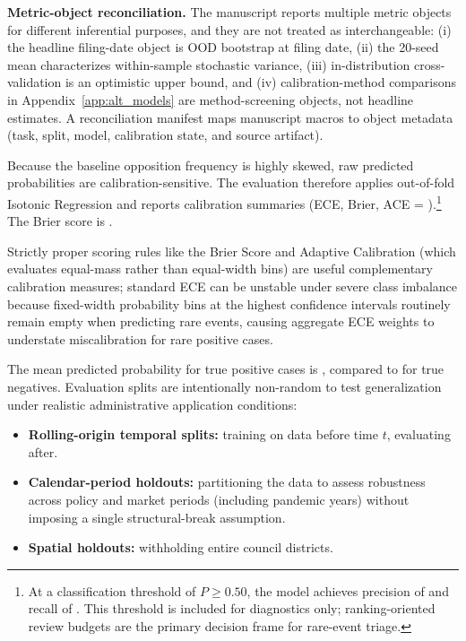 \documentclass[11pt, letterpaper]{article}
\begin{document}
\textbf{Metric-object reconciliation.} The manuscript reports multiple metric objects for different inferential purposes, and they are not treated as interchangeable: (i) the headline filing-date object is OOD bootstrap at filing date, (ii) the 20-seed mean characterizes within-sample stochastic variance, (iii) in-distribution cross-validation is an optimistic upper bound, and (iv) calibration-method comparisons in Appendix~\ref{app:alt_models} are method-screening objects, not headline estimates. A reconciliation manifest maps manuscript macros to object metadata (task, split, model, calibration state, and source artifact).

Because the baseline opposition frequency is highly skewed, raw predicted probabilities are calibration-sensitive. The evaluation therefore applies out-of-fold Isotonic Regression and reports calibration summaries (ECE, Brier, ACE = \metricACE{}).\footnote{At a classification threshold of $P \geq 0.50$, the model achieves precision of \metricPrecisionAtFifty{} and recall of \metricRecallAtFifty{}. This threshold is included for diagnostics only; ranking-oriented review budgets are the primary decision frame for rare-event triage.} The Brier score is \metricBrierScore{}.

Strictly proper scoring rules like the Brier Score \cite{brier1950verification} and Adaptive Calibration (which evaluates equal-mass rather than equal-width bins) are useful complementary calibration measures; standard ECE can be unstable under severe class imbalance because fixed-width probability bins at the highest confidence intervals routinely remain empty when predicting rare events, causing aggregate ECE weights to understate miscalibration for rare positive cases.

The mean predicted probability for true positive cases is \metricMeanProbTP{}, compared to \metricMeanProbTN{} for true negatives. Evaluation splits are intentionally non-random to test generalization under realistic administrative application conditions:
\begin{itemize}
    \item \textbf{Rolling-origin temporal splits:} training on data before time $t$, evaluating after.
    \item \textbf{Calendar-period holdouts:} partitioning the data to assess robustness across policy and market periods (including pandemic years) without imposing a single structural-break assumption.
    \item \textbf{Spatial holdouts:} withholding entire council districts.
\end{itemize}
\end{document}
